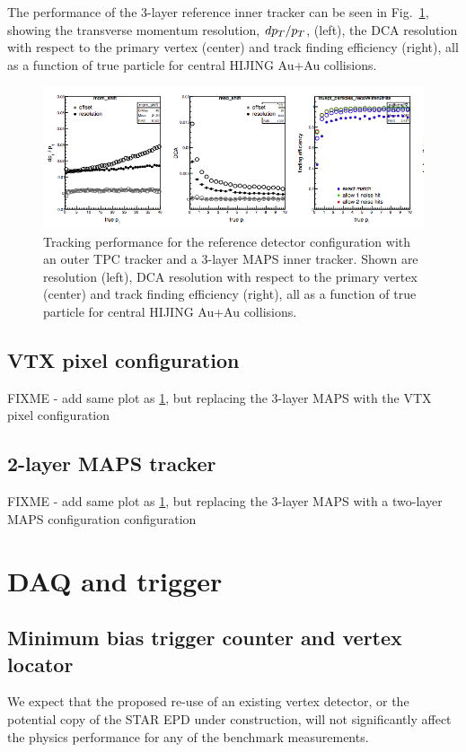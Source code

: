 The performance of the 3-layer reference inner tracker can be seen in Fig.~\ref{fig:tracking_reference}, showing the 
transverse momentum resolution, $d\mbox{${p_T}$}/\mbox{${p_T}$}$, (left), the DCA resolution with respect to the primary vertex (center) 
and track finding efficiency (right), all as a function of true particle \pt for central HIJING Au+Au collisions. 
\begin{figure}[hbt]
  \centering
  \includegraphics[width=0.9\linewidth]{figs/tracking_performance_reference}
  \caption{Tracking performance for the reference detector configuration with an
  outer TPC tracker and a 3-layer MAPS inner tracker. Shown are \pt resolution (left), 
  DCA resolution with respect to the primary vertex (center) and track finding efficiency (right), all as a function
of true particle \pt for central HIJING Au+Au collisions.}
  \label{fig:tracking_reference}
\end{figure}

\subsection{VTX pixel configuration} FIXME - add same plot as \ref{fig:tracking_reference}, but replacing the 3-layer MAPS with the VTX pixel 
configuration
\subsection{2-layer MAPS tracker} FIXME - add same plot as \ref{fig:tracking_reference}, but replacing the 3-layer MAPS with a two-layer MAPS configuration
configuration

\section{DAQ and trigger}
\subsection{Minimum bias trigger counter and vertex locator}
We expect that the proposed re-use of an existing vertex detector, or the potential copy of the STAR EPD under construction, will not significantly affect
the physics performance for any of the benchmark measurements.
